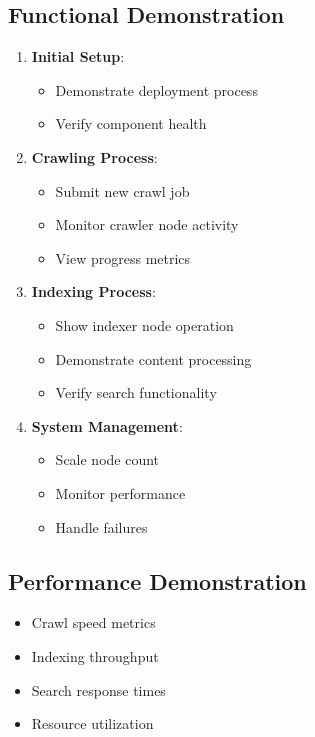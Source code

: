 \documentclass[12pt,a4paper]{report}
\begin{document}
\subsection{Functional Demonstration}
\begin{enumerate}
\item \textbf{Initial Setup}:
\begin{itemize}
    \item Demonstrate deployment process
    \item Verify component health
\end{itemize}

\item \textbf{Crawling Process}:
\begin{itemize}
    \item Submit new crawl job
    \item Monitor crawler node activity
    \item View progress metrics
\end{itemize}

\item \textbf{Indexing Process}:
\begin{itemize}
    \item Show indexer node operation
    \item Demonstrate content processing
    \item Verify search functionality
\end{itemize}

\item \textbf{System Management}:
\begin{itemize}
    \item Scale node count
    \item Monitor performance
    \item Handle failures
\end{itemize}
\end{enumerate}

\subsection{Performance Demonstration}
\begin{itemize}
\item Crawl speed metrics
\item Indexing throughput
\item Search response times
\item Resource utilization
\end{itemize}
\end{document}
